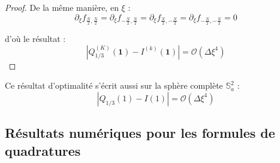 \begin{proof}
De la même manière, en $\xi$ :
\begin{equation}
\partial_{\xi} f_{\frac{N}{2},\frac{N}{2}} = \partial_{\xi} f_{-\frac{N}{2},\frac{N}{2}} = \partial_{\xi} f_{\frac{N}{2},-\frac{N}{2}} = \partial_{\xi} f_{-\frac{N}{2},-\frac{N}{2}} = 0 
\end{equation}

d'où le résultat :
\begin{equation}
|Q_{1/3}^{(K)}(\mathbf{1}) - I^{(k)}(\mathbf{1}) | = \mathcal{O}\left( \Delta \xi^4 \right)
\end{equation}
\end{proof}

Ce résultat d'optimalité s'écrit aussi sur la sphère complète $\mathbb{S}_a^2$ :
\begin{equation}
|Q_{1/3}(1) - I(1) | = \mathcal{O}\left( \Delta \xi^4 \right)
\end{equation}
























\subsection{Résultats numériques pour les formules de quadratures}

